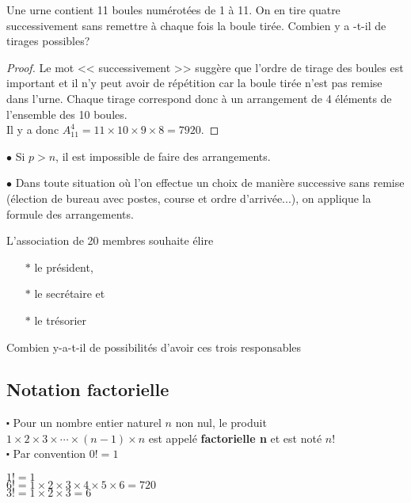 \begin{exercice}

 Une urne contient 11 boules numérotées de 1 à 11. On en tire quatre successivement sans  remettre à chaque fois la boule  tirée.  Combien y a -t-il de tirages  possibles? 
\end{exercice}
 \begin{proof}
 
  Le  mot << successivement >> suggère que l'ordre de tirage des boules est important et il n'y peut avoir de répétition car la boule tirée n'est pas remise dans l'urne. 
Chaque tirage correspond donc  à un arrangement de 4 éléments de l'ensemble des 10 boules.\\
Il y a donc $A_{11}^{4} =11\times 10\times 9 \times 8 =7920.  $
 \end{proof}
\begin{remark}
 
  $ \bullet $ Si $  p > n $, il est impossible de faire des arrangements.

$ \bullet $ Dans toute situation  où l'on effectue un choix de manière successive sans remise (élection de bureau avec postes, course et ordre d'arrivée...), on applique la formule des arrangements.
\end{remark}
 \begin{exercice}
L'association de 20 membres souhaite élire
\begin{itemize}
 \item[$  \ast$]   le président,
  \item[$  \ast$]  le secrétaire et
 \item[$  \ast$]    le trésorier
\end{itemize}
    Combien y-a-t-il de possibilités d'avoir ces trois responsables
   \end{exercice}
\subsection*{Notation factorielle}
$ \centerdot $ Pour un nombre  entier naturel $ n $ non nul, le produit $ 1\times 2\times 3\times \cdots \times (n-1)\times n  $ est appelé \textbf{factorielle n}  et est noté $n!$\\
$ \centerdot $ Par convention $ 0!=1 $
\begin{example}
$1!=1$\\
$6!=1\times 2\times 3\times 4\times 5 \times 6= 720$\\
$3!=1\times 2\times 3= 6$
\end{example}


